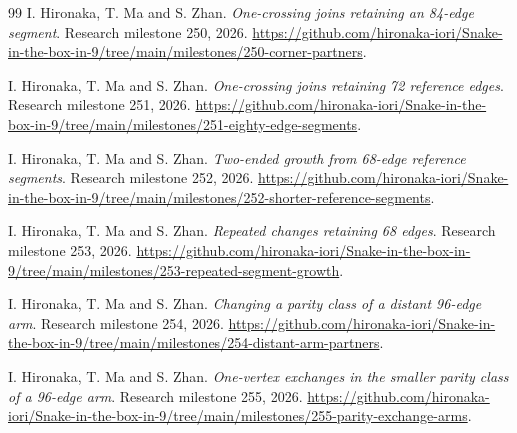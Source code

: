 \documentclass[11pt,a4paper]{article}
\theoremstyle{definition}
\theoremstyle{remark}
\begin{document}
\begin{thebibliography}{99}
I. Hironaka, T. Ma and S. Zhan.
\emph{One-crossing joins retaining an 84-edge segment}.
Research milestone 250, 2026.
\url{https://github.com/hironaka-iori/Snake-in-the-box-in-9/tree/main/milestones/250-corner-partners}.

I. Hironaka, T. Ma and S. Zhan.
\emph{One-crossing joins retaining 72 reference edges}.
Research milestone 251, 2026.
\url{https://github.com/hironaka-iori/Snake-in-the-box-in-9/tree/main/milestones/251-eighty-edge-segments}.

I. Hironaka, T. Ma and S. Zhan.
\emph{Two-ended growth from 68-edge reference segments}.
Research milestone 252, 2026.
\url{https://github.com/hironaka-iori/Snake-in-the-box-in-9/tree/main/milestones/252-shorter-reference-segments}.

I. Hironaka, T. Ma and S. Zhan.
\emph{Repeated changes retaining 68 edges}.
Research milestone 253, 2026.
\url{https://github.com/hironaka-iori/Snake-in-the-box-in-9/tree/main/milestones/253-repeated-segment-growth}.

I. Hironaka, T. Ma and S. Zhan.
\emph{Changing a parity class of a distant 96-edge arm}.
Research milestone 254, 2026.
\url{https://github.com/hironaka-iori/Snake-in-the-box-in-9/tree/main/milestones/254-distant-arm-partners}.

I. Hironaka, T. Ma and S. Zhan.
\emph{One-vertex exchanges in the smaller parity class of a 96-edge arm}.
Research milestone 255, 2026.
\url{https://github.com/hironaka-iori/Snake-in-the-box-in-9/tree/main/milestones/255-parity-exchange-arms}.

\end{thebibliography}
\end{document}
